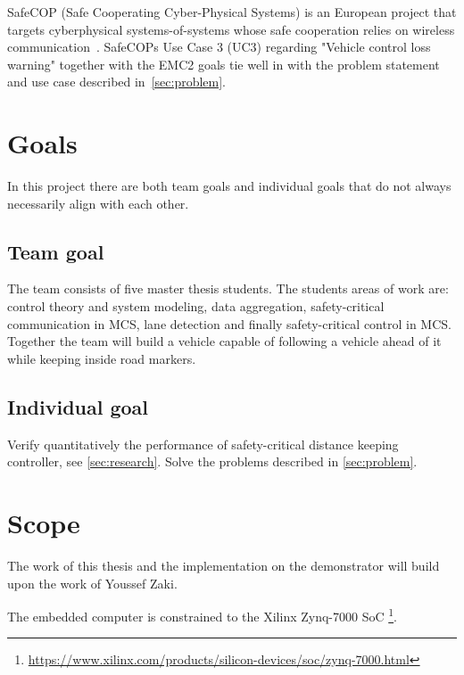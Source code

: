 SafeCOP (Safe Cooperating Cyber-Physical Systems) is an European project that targets cyberphysical systems-of-systems whose safe cooperation relies on wireless communication~\cite{safecop2016}. SafeCOPs Use Case 3 (UC3) regarding "Vehicle control loss warning" together with the EMC2 goals tie well in with the problem statement and use case described in~\ref{sec:problem}. %

\section{Goals}
In this project there are both team goals and individual goals that do not always necessarily align with each other.

\subsection{Team goal}
The team consists of five master thesis students. The students areas of work are: control theory and system modeling, data aggregation, safety-critical communication in MCS, lane detection and finally safety-critical control in MCS. Together the team will build a vehicle capable of following a vehicle ahead of it while keeping inside road markers.

\subsection{Individual goal}
Verify quantitatively the performance of safety-critical distance keeping controller, see \ref{sec:research}. Solve the problems described in \ref{sec:problem}.

\section{Scope}
\label{sec:scope}
The work of this thesis and the implementation on the demonstrator will build upon the work of Youssef Zaki\cite{zaki2016}.

The embedded computer is constrained to the Xilinx Zynq-7000 SoC \footnote{\url{https://www.xilinx.com/products/silicon-devices/soc/zynq-7000.html}}. 

